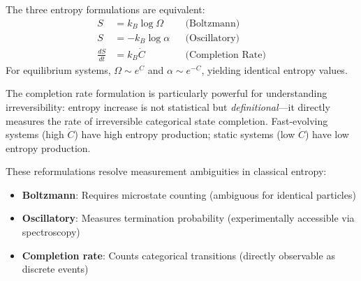 \begin{proposition}
\label{prop:entropy_equivalence}
The three entropy formulations are equivalent:
\begin{align}
S &= k_B \log \Omega && \text{(Boltzmann)} \\
S &= -k_B \log \alpha && \text{(Oscillatory)} \\
\frac{dS}{dt} &= k_B \dot{C} && \text{(Completion Rate)}
\end{align}
For equilibrium systems, $\Omega \sim e^{C}$ and $\alpha \sim e^{-C}$, yielding identical entropy values.
\end{proposition}

The completion rate formulation is particularly powerful for understanding irreversibility: entropy increase is not statistical but \emph{definitional}—it directly measures the rate of irreversible categorical state completion. Fast-evolving systems (high $\dot{C}$) have high entropy production; static systems (low $\dot{C}$) have low entropy production.

\begin{remark}
These reformulations resolve measurement ambiguities in classical entropy:
\begin{itemize}
\item \textbf{Boltzmann}: Requires microstate counting (ambiguous for identical particles)
\item \textbf{Oscillatory}: Measures termination probability (experimentally accessible via spectroscopy)
\item \textbf{Completion rate}: Counts categorical transitions (directly observable as discrete events)
\end{itemize}
\end{remark}

